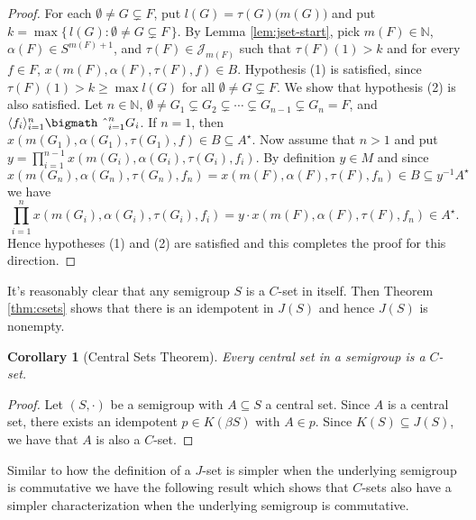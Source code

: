 \documentclass[12pt,showtrims]{memoir}
\theoremstyle{plain}
\newtheorem{cor}[thm]{Corollary}
\theoremstyle{definition}
\newcommand{\la}{\langle}
\newcommand{\ra}{\rangle}
\newcommand{\bbN}{\mathbb{N}}
\newcommand{\calJ}{\mathcal{J}}
\newcommand{\bigtimes}{\hbox{\bigmath \char'2}}
\begin{document}
\begin{proof}
  For each $\emptyset \ne G \subsetneq F$, put $l(G) = \tau(G)\bigl( m(G) \bigr)$ and put $k = \max\{\, l(G) : \emptyset \ne G \subsetneq F \,\}$.
  By Lemma \ref{lem:jset-start}, pick $m(F) \in \bbN$, $\alpha(F) \in S^{m(F)+1}$, and $\tau(F) \in \calJ_{m(F)}$ such that $\tau(F)(1) > k$ and for every $f \in F$, $x(m(F), \alpha(F), \tau(F), f) \in B$.
  Hypothesis (1) is satisfied, since $\tau(F)(1) > k \ge \max l(G)$ for all $\emptyset \ne G \subsetneq F$.
  We show that hypothesis (2) is also satisfied.
  Let $n \in \bbN$, $\emptyset \ne G_1 \subsetneq G_2 \subsetneq \cdots \subsetneq G_{n-1} \subsetneq G_n = F$, and $\la f_i \ra_{i=1}^n \bigtimes_{i=1}^n G_i$. 
  If $n = 1$, then $x(m(G_1), \alpha(G_1), \tau(G_1), f) \in B \subseteq A^\star$.
  Now assume that $n > 1$ and put $y = \prod_{i=1}^{n-1} x(m(G_i), \alpha(G_i), \tau(G_i), f_i)$. 
  By definition $y \in M$ and since $x(m(G_n), \alpha(G_n), \tau(G_n), f_n) = x(m(F), \alpha(F), \tau(F), f_n) \in B \subseteq y^{-1}A^\star$ we have
  \[
    \textstyle
    \prod_{i=1}^n x(m(G_i), \alpha(G_i), \tau(G_i), f_i) = y \cdot x(m(F), \alpha(F), \tau(F), f_n) \in A^\star.
  \]
  Hence hypotheses (1) and (2) are satisfied and this completes the proof for this direction.
\end{proof}

It's reasonably clear that any semigroup $S$ is a $C$-set in itself.
Then Theorem \ref{thm:csets} shows that there is an idempotent in $J(S)$ and hence $J(S)$ is nonempty.

\begin{cor}[Central Sets Theorem]
  Every central set in a semigroup is a $C$-set.
\end{cor}
\begin{proof}
  Let $(S, \cdot)$ be a semigroup with $A \subseteq S$ a central set. 
  Since $A$ is a central set, there exists an idempotent $p \in K(\beta S)$ with $A \in p$.
  Since $K(S) \subseteq J(S)$, we have that $A$ is also a $C$-set.
\end{proof}

Similar to how the definition of a $J$-set is simpler when the underlying semigroup is commutative we have the following result which shows that $C$-sets also have a simpler characterization when the underlying semigroup is commutative. 
\end{document}
